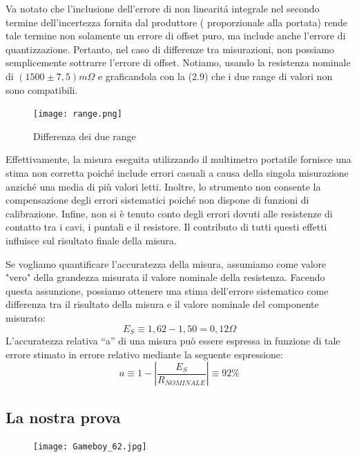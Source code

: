 Va notato che l'inclusione dell'errore di non linearit\'a integrale nel secondo termine dell'incertezza fornita dal produttore ( proporzionale alla portata) rende tale termine non solamente un errore di offset puro, ma include anche l'errore di quantizzazione. Pertanto, nel caso di differenze tra misurazioni, non possiamo semplicemente sottrarre l'errore di offset.
Notiamo, usando la resistenza nominale di $(1500 \pm 7,5) m\Omega$ e graficandola con la (2.9) che i due range di valori non sono compatibili.

\begin{figure}[h]
    \centering
    \texttt{[image: range.png]}
    \caption{Differenza dei due range}
    \label{fig:range}
\end{figure}
\FloatBarrier

Effettivamente, la misura eseguita utilizzando il multimetro portatile fornisce una stima non corretta poiché include errori casuali a causa della singola misurazione anziché una media di più valori letti. Inoltre, lo strumento non consente la compensazione degli errori sistematici poiché non dispone di funzioni di calibrazione. Infine, non si è tenuto conto degli errori dovuti alle resistenze di contatto tra i cavi, i puntali e il resistore. Il contributo di tutti questi effetti influisce sul risultato finale della misura.

Se vogliamo quantificare l'accuratezza della misura, assumiamo come valore "vero" della grandezza misurata il valore nominale della resistenza. Facendo questa assunzione, possiamo ottenere una stima dell'errore sistematico come differenza tra il risultato della misura e il valore nominale del componente misurato:
\begin{equation}
    E_S \equiv 1,62 - 1,50 = 0,12\Omega
\end{equation}
L’accuratezza relativa “a” di una misura può essere espressa in funzione di tale errore 
stimato in errore relativo mediante la seguente espressione: 
\begin{equation}
     a \equiv 1 - \left| \frac{E_S}{R_{NOMINALE}}\right| \equiv 92\%
\end{equation}


\subsection*{La nostra prova}
\label{sub:nosta_prova_first}


\vspace{0.5cm}
\FloatBarrier
\begin{figure}
    \centering
    \texttt{[image: Gameboy\_62.jpg]}
    \label{fig:mult_port_nostro}
\end{figure}
\FloatBarrier
    
